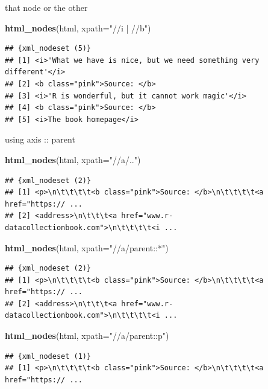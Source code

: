 \documentclass[ignorenonframetext,]{beamer}
\newenvironment{Shaded}{\begin{snugshade}}{\end{snugshade}}
\newcommand{\KeywordTok}[1]{\textcolor[rgb]{0.13,0.29,0.53}{\textbf{{#1}}}}
\newcommand{\DataTypeTok}[1]{\textcolor[rgb]{0.13,0.29,0.53}{{#1}}}
\newcommand{\StringTok}[1]{\textcolor[rgb]{0.31,0.60,0.02}{{#1}}}
\newcommand{\NormalTok}[1]{{#1}}
\begin{document}
\begin{frame}[fragile]{that node or the other}

\begin{Shaded}
\begin{Highlighting}[]
\KeywordTok{html_nodes}\NormalTok{(html, }\DataTypeTok{xpath=}\StringTok{"//i | //b"}\NormalTok{)}
\end{Highlighting}
\end{Shaded}

\begin{verbatim}
## {xml_nodeset (5)}
## [1] <i>'What we have is nice, but we need something very different'</i>
## [2] <b class="pink">Source: </b>
## [3] <i>'R is wonderful, but it cannot work magic'</i>
## [4] <b class="pink">Source: </b>
## [5] <i>The book homepage</i>
\end{verbatim}

\end{frame}

\begin{frame}[fragile]{using axis :: parent}

\begin{Shaded}
\begin{Highlighting}[]
\KeywordTok{html_nodes}\NormalTok{(html, }\DataTypeTok{xpath=}\StringTok{"//a/.."}\NormalTok{)}
\end{Highlighting}
\end{Shaded}

\begin{verbatim}
## {xml_nodeset (2)}
## [1] <p>\n\t\t\t\t<b class="pink">Source: </b>\n\t\t\t\t<a href="https:// ...
## [2] <address>\n\t\t\t<a href="www.r-datacollectionbook.com">\n\t\t\t\t<i ...
\end{verbatim}

\begin{Shaded}
\begin{Highlighting}[]
\KeywordTok{html_nodes}\NormalTok{(html, }\DataTypeTok{xpath=}\StringTok{"//a/parent::*"}\NormalTok{)}
\end{Highlighting}
\end{Shaded}

\begin{verbatim}
## {xml_nodeset (2)}
## [1] <p>\n\t\t\t\t<b class="pink">Source: </b>\n\t\t\t\t<a href="https:// ...
## [2] <address>\n\t\t\t<a href="www.r-datacollectionbook.com">\n\t\t\t\t<i ...
\end{verbatim}

\begin{Shaded}
\begin{Highlighting}[]
\KeywordTok{html_nodes}\NormalTok{(html, }\DataTypeTok{xpath=}\StringTok{"//a/parent::p"}\NormalTok{)}
\end{Highlighting}
\end{Shaded}

\begin{verbatim}
## {xml_nodeset (1)}
## [1] <p>\n\t\t\t\t<b class="pink">Source: </b>\n\t\t\t\t<a href="https:// ...
\end{verbatim}

\end{frame}
\end{document}
